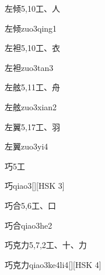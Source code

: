 \begin{entry}{左倾}{5,10}{⼯、⼈}
  \begin{phonetics}{左倾}{zuo3qing1}
  \end{phonetics}
\end{entry}

\begin{entry}{左袒}{5,10}{⼯、⾐}
  \begin{phonetics}{左袒}{zuo3tan3}
  \end{phonetics}
\end{entry}

\begin{entry}{左舷}{5,11}{⼯、⾈}
  \begin{phonetics}{左舷}{zuo3xian2}
  \end{phonetics}
\end{entry}

\begin{entry}{左翼}{5,17}{⼯、⽻}
  \begin{phonetics}{左翼}{zuo3yi4}
  \end{phonetics}
\end{entry}

\begin{entry}{巧}{5}{⼯}
  \begin{phonetics}{巧}{qiao3}[][HSK 3]
  \end{phonetics}
\end{entry}

\begin{entry}{巧合}{5,6}{⼯、⼝}
  \begin{phonetics}{巧合}{qiao3he2}
  \end{phonetics}
\end{entry}

\begin{entry}{巧克力}{5,7,2}{⼯、⼗、⼒}
  \begin{phonetics}{巧克力}{qiao3ke4li4}[][HSK 4]
  \end{phonetics}
\end{entry}

